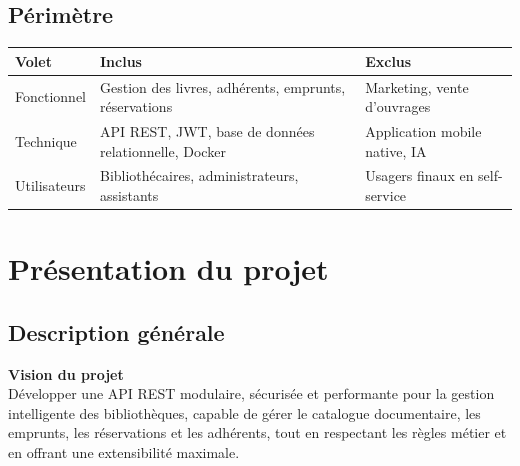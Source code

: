 \documentclass[12pt,a4paper]{article}
\newcommand{\tableheader}[1]{%
  \cellcolor{navy}\color{white}\bfseries #1%
}
\begin{document}
\subsection{P\'erim\`etre}
\begin{center}
\begin{tabularx}{\textwidth}{|C{3cm}|C{4cm}|X|}
\hline
\tableheader{Volet} & \tableheader{Inclus} & \tableheader{Exclus} \\
\hline
Fonctionnel & Gestion des livres, adh\'erents, emprunts, r\'eservations & Marketing, vente d'ouvrages \\
\hline
Technique & API REST, JWT, base de donn\'ees relationnelle, Docker & Application mobile native, IA \\
\hline
Utilisateurs & Biblioth\'ecaires, administrateurs, assistants & Usagers finaux en self-service \\
\hline
\end{tabularx}
\end{center}

\section{Pr\'esentation du projet}

\subsection{Description g\'en\'erale}
\begin{visionbox}
\centering
\Large\textbf{Vision du projet}\\[0.4cm]
\normalsize
D\'evelopper une API REST modulaire, s\'ecuris\'ee et performante pour la gestion intelligente des biblioth\`eques, capable de g\'erer le catalogue documentaire, les emprunts, les r\'eservations et les adh\'erents, tout en respectant les r\`egles m\'etier et en offrant une extensibilit\'e maximale.
\end{visionbox}
\end{document}
